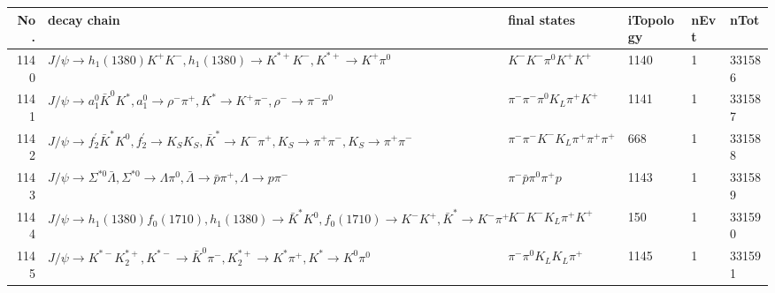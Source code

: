\begin{table}[htbp] 
\begin{center}
\begin{small}
\begin{tabular}{rlllll}\hline\hline
 No. & decay chain & final states &  iTopology & nEvt & nTot \\\hline
1140&$J/\psi       \rightarrow h_{1}(1380)    K^{+}          K^{-}          , h_{1}(1380)     \rightarrow K^{*+}         K^{-}          , K^{*+}          \rightarrow K^{+}          \pi^{0}        $&$K^{-}          K^{-}          \pi^{0}        K^{+}          K^{+}          $& 1140&    1&331586\\
1141&$J/\psi       \rightarrow a_{1}^{0}      \bar{K}^{0}   K^{*}          , a_{1}^{0}       \rightarrow \rho^{-}      \pi^{+}        , K^{*}           \rightarrow K^{+}          \pi^{-}        , \rho^{-}       \rightarrow \pi^{-}        \pi^{0}        $&$\pi^{-}        \pi^{-}        \pi^{0}        K_{L}          \pi^{+}        K^{+}          $& 1141&    1&331587\\
1142&$J/\psi       \rightarrow f_2^{'}       \bar{K}^{*}   K^{0}          , f_2^{'}        \rightarrow K_{S}          K_{S}          , \bar{K}^{*}    \rightarrow K^{-}          \pi^{+}        , K_{S}           \rightarrow \pi^{+}        \pi^{-}        , K_{S}           \rightarrow \pi^{+}        \pi^{-}        $&$\pi^{-}        \pi^{-}        K^{-}          K_{L}          \pi^{+}        \pi^{+}        \pi^{+}        $&  668&    1&331588\\
1143&$J/\psi       \rightarrow \Sigma^{*0}       \bar{\Lambda}    , \Sigma^{*0}        \rightarrow \Lambda           \pi^{0}        , \bar{\Lambda}     \rightarrow \bar{p}          \pi^{+}        , \Lambda            \rightarrow p                 \pi^{-}        $&$\pi^{-}        \bar{p}          \pi^{0}        \pi^{+}        p                 $& 1143&    1&331589\\
1144&$J/\psi       \rightarrow h_{1}(1380)    f_{0}(1710)    , h_{1}(1380)     \rightarrow \bar{K}^{*}   K^{0}          , f_{0}(1710)     \rightarrow K^{-}          K^{+}          , \bar{K}^{*}    \rightarrow K^{-}          \pi^{+}        $&$K^{-}          K^{-}          K_{L}          \pi^{+}        K^{+}          $&  150&    1&331590\\
1145&$J/\psi       \rightarrow K^{*-}         K_2^{*+}       , K^{*-}          \rightarrow \bar{K}^{0}   \pi^{-}        , K_2^{*+}        \rightarrow K^{*}          \pi^{+}        , K^{*}           \rightarrow K^{0}          \pi^{0}        $&$\pi^{-}        \pi^{0}        K_{L}          K_{L}          \pi^{+}        $& 1145&    1&331591\\

\end{tabular}
\end{small}
\end{center}
\end{table}
